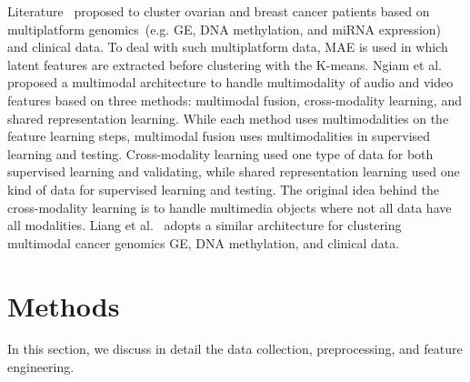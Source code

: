 \hspace*{3.5mm} %
Literature~\cite{liang} proposed to cluster ovarian and breast cancer patients based on multiplatform genomics~(e.g. GE, DNA methylation, and miRNA expression) and clinical data. To deal with such multiplatform data, MAE is used in which latent features are extracted before clustering with the K-means. Ngiam et al.~\cite{NgiamKKNLN11} proposed a multimodal architecture to handle multimodality of audio and video features based on three methods: multimodal fusion, cross-modality learning, and shared representation learning.
While each method uses multimodalities on the feature learning steps, multimodal fusion uses multimodalities in supervised learning and testing. Cross-modality learning used one type of data for both supervised learning and validating, while shared representation learning used one kind of data for supervised learning and testing. The original idea behind the cross-modality learning is to handle multimedia objects where not all data have all modalities. Liang et al.~\cite{liang} adopts a similar architecture for clustering multimodal cancer genomics GE, DNA methylation, and clinical data.

\section{Methods}\label{chapter_3:mm}
In this section, we discuss in detail the data collection, preprocessing, and feature engineering. %

